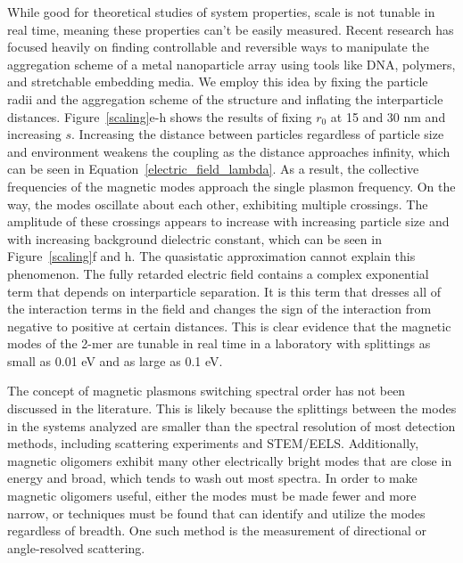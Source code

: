 \documentclass[journal=apchd5,manuscript=article]{achemso}
\begin{document}
While good for theoretical studies of system properties, scale is not tunable in real time, meaning these properties can't be easily measured. Recent research has focused heavily on finding controllable and reversible ways to manipulate the aggregation scheme of a metal nanoparticle array using tools like DNA, polymers, and stretchable embedding media\cite{Yang2016,Ginger2017,NaLiu2017,DanLuo2009}. We employ this idea by fixing the particle radii and the aggregation scheme of the structure and inflating the interparticle distances. Figure~\ref{scaling}e-h shows the results of fixing $r_0$ at 15 and 30 nm and increasing $s$. Increasing the distance between particles regardless of particle size and environment weakens the coupling as the distance approaches infinity, which can be seen in Equation~\ref{electric_field_lambda}. As a result, the collective frequencies of the magnetic modes approach the single plasmon frequency. On the way, the modes oscillate about each other, exhibiting multiple crossings. The amplitude of these crossings appears to increase with increasing particle size and with increasing background dielectric constant, which can be seen in Figure~\ref{scaling}f and h. The quasistatic approximation cannot explain this phenomenon. The fully retarded electric field contains a complex exponential term that depends on interparticle separation. It is this term that dresses all of the interaction terms in the field and changes the sign of the interaction from negative to positive at certain distances. This is clear evidence that the magnetic modes of the 2-mer are tunable in real time in a laboratory with splittings as small as 0.01 eV and as large as 0.1 eV. 

The concept of magnetic plasmons switching spectral order has not been discussed in the literature. This is likely because the splittings between the modes in the systems analyzed are smaller than the spectral resolution of most detection methods, including scattering experiments and STEM/EELS. Additionally, magnetic oligomers exhibit many other electrically bright modes that are close in energy and broad, which tends to wash out most spectra. In order to make magnetic oligomers useful, either the modes must be made fewer and more narrow, or techniques must be found that can identify and utilize the modes regardless of breadth. One such method is the measurement of directional or angle-resolved scattering.
\end{document}
